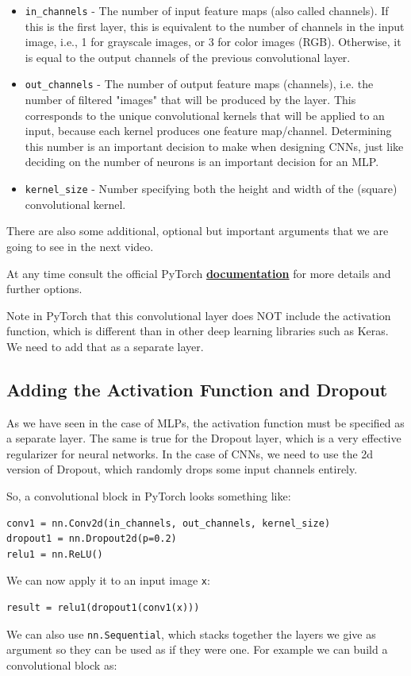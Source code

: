 \begin{itemize}
    \item \lstinline{in_channels} - The number of input feature maps (also called channels). If this is the first layer, this is equivalent to the number of channels in the input image, i.e., 1 for grayscale images, or 3 for color images (RGB). Otherwise, it is equal to the output channels of the previous convolutional layer.
    \item \lstinline{out_channels} - The number of output feature maps (channels), i.e. the number of filtered "images" that will be produced by the layer. This corresponds to the unique convolutional kernels that will be applied to an input, because each kernel produces one feature map/channel. Determining this number is an important decision to make when designing CNNs, just like deciding on the number of neurons is an important decision for an MLP.
    \item \lstinline{kernel_size} - Number specifying both the height and width of the (square) convolutional kernel.
\end{itemize}
There are also some additional, optional but important arguments that we are going to see in the next video. \newline

At any time consult the official PyTorch \href{https://pytorch.org/docs/stable/generated/torch.nn.Conv2d.html\#torch.nn.Conv2d}{\textbf{documentation}} for more details and further options. \newline

Note in PyTorch that this convolutional layer does NOT include the activation function, which is different than in other deep learning libraries such as Keras. We need to add that as a separate layer.

\subsection{Adding the Activation Function and Dropout}

As we have seen in the case of MLPs, the activation function must be specified as a separate layer. The same is true for the Dropout layer, which is a very effective regularizer for neural networks. In the case of CNNs, we need to use the 2d version of Dropout, which randomly drops some input channels entirely. \newline

So, a convolutional block in PyTorch looks something like:
\begin{lstlisting}
conv1 = nn.Conv2d(in_channels, out_channels, kernel_size)
dropout1 = nn.Dropout2d(p=0.2)
relu1 = nn.ReLU()
\end{lstlisting}
We can now apply it to an input image \verb|x|:
\begin{lstlisting}
result = relu1(dropout1(conv1(x)))
\end{lstlisting}
We can also use \lstinline|nn.Sequential|, which stacks together the layers we give as argument so they can be used as if they were one. For example we can build a convolutional block as:

